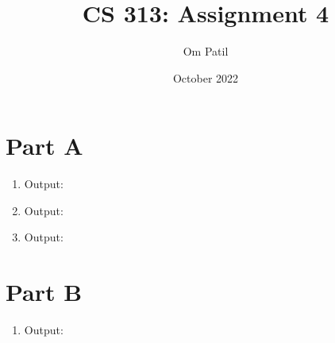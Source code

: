 \documentclass{article}
\title{CS 313: Assignment 4}
\author{Om Patil}
\date{October 2022}
\begin{document}
\maketitle

\section*{Part A}
\begin{center}
	\begin{enumerate}
		\item Output: \\
		\item Output: \\
		\item Output: \\
	\end{enumerate}
\end{center}

\section*{Part B}
\begin{center}
	\begin{enumerate}
		\item Output: \\
	\end{enumerate}
\end{center}
\end{document}
